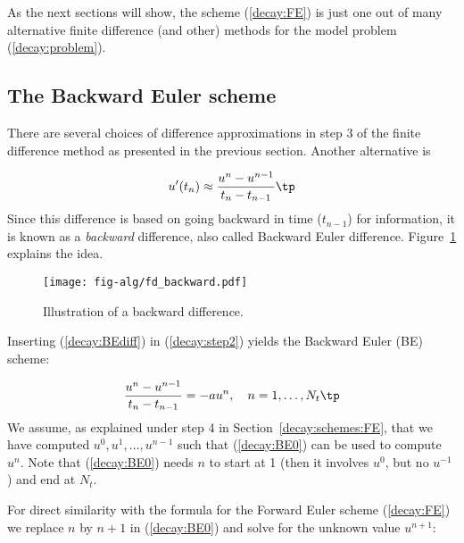 \documentclass[graybox,sectrefs,envcountresetchap,open=right,final]{svmonodo}
\begin{document}
As the next sections will show, the scheme (\ref{decay:FE}) is just one
out of many alternative finite difference (and other) methods for
the model problem (\ref{decay:problem}).

\subsection{The Backward Euler scheme}
\label{decay:schemes:BE}

 

There are several choices of difference approximations in step 3 of
the finite difference method as presented in the previous section.
Another alternative is

\begin{equation}
u^{\prime}(t_n) \approx \frac{u^{n}-u^{n-1}}{t_{n}-t_{n-1}}\tp
\label{decay:BEdiff}
\end{equation}
Since this difference is based on going backward in time ($t_{n-1}$)
for information, it is known as a \emph{backward} difference, also called
Backward Euler difference.
Figure~\ref{decay:sketch:BE} explains the idea.


\begin{figure}[!ht]  %
  \centerline{\texttt{[image: fig-alg/fd\_backward.pdf]}}
  \caption{
  Illustration of a backward difference. \label{decay:sketch:BE}
  }
\end{figure}



Inserting (\ref{decay:BEdiff}) in (\ref{decay:step2}) yields
the Backward Euler (BE) scheme:

\begin{equation}
\frac{u^{n}-u^{n-1}}{t_{n}-t_{n-1}} = -a u^n,\quad n=1,\ldots,N_t\tp
\label{decay:BE0}
\end{equation}
We assume, as explained under step 4 in Section~\ref{decay:schemes:FE},
that we have computed $u^0, u^1, \ldots, u^{n-1}$ such that
(\ref{decay:BE0}) can be used to compute $u^n$. Note that
(\ref{decay:BE0}) needs $n$ to start at 1 (then it involves $u^0$, but
no $u^{-1}$) and end at $N_t$.

For direct similarity with the formula for the
Forward Euler scheme (\ref{decay:FE})
we replace $n$ by $n+1$ in (\ref{decay:BE0}) and solve for the
unknown value $u^{n+1}$:
\end{document}
